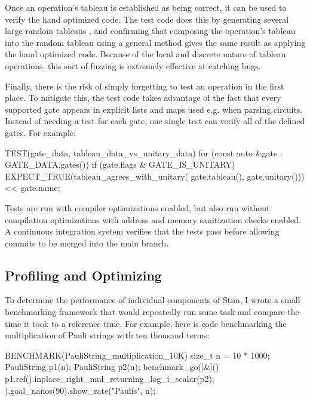\documentclass[onecolumn,unpublished]{quantumarticle}
\theoremstyle{definition}
\theoremstyle{definition}
\theoremstyle{definition}
\begin{document}
Once an operation's tableau is established as being correct, it can be used to verify the hand optimized code.
The test code does this by generating several large random tableaus \cite{bravyi2020randomtableau}, and confirming that composing the operation's tableau into the random tableau using a general method gives the same result as applying the hand optimized code.
Because of the local and discrete nature of tableau operations, this sort of fuzzing is extremely effective at catching bugs.

Finally, there is the risk of simply forgetting to test an operation in the first place.
To mitigate this, the test code takes advantage of the fact that every supported gate appears in explicit lists and maps used e.g. when parsing circuits.
Instead of needing a test for each gate, one single test can verify all of the defined gates.
For example:

\begin{cpp}
    TEST(gate_data, tableau_data_vs_unitary_data) {
        for (const auto &gate : GATE_DATA.gates()) {
            if (gate.flags & GATE_IS_UNITARY) {
                EXPECT_TRUE(tableau_agrees_with_unitary(
                    gate.tableau(), gate.unitary())) << gate.name;
            }
        }
    }
\end{cpp}

Tests are run with compiler optimizations enabled, but also run without compilation optimizations with address and memory sanitization checks enabled.
A continuous integration system verifies that the tests pass before allowing commits to be merged into the main branch.

\subsection{Profiling and Optimizing}

To determine the performance of individual components of Stim, I wrote a small benchmarking framework that would repeatedly run some task and compare the time it took to a reference time.
For example, here is code benchmarking the multiplication of Pauli strings with ten thousand terms:

\begin{cpp}
    BENCHMARK(PauliString_multiplication_10K) {
        size_t n = 10 * 1000;
        PauliString p1(n);
        PauliString p2(n);
        benchmark_go([&]() {
            p1.ref().inplace_right_mul_returning_log_i_scalar(p2);
        }).goal_nanos(90).show_rate("Paulis", n);
    }
\end{cpp}
\end{document}
